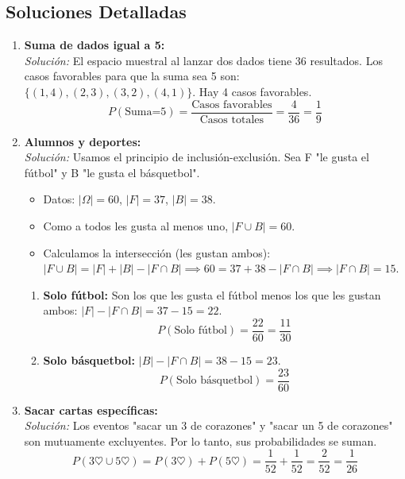 \documentclass[12pt, letterpaper]{article}
\begin{document}
\subsection{Soluciones Detalladas}
\begin{enumerate}
	\item \textbf{Suma de dados igual a 5:} \\
	      \textit{Solución:} El espacio muestral al lanzar dos dados tiene 36 resultados. Los casos favorables para que la suma sea 5 son: $\{(1,4), (2,3), (3,2), (4,1)\}$. Hay 4 casos favorables.
	      \[ P(\text{Suma=5}) = \frac{\text{Casos favorables}}{\text{Casos totales}} = \frac{4}{36} = \frac{1}{9} \]

	\item \textbf{Alumnos y deportes:} \\
	      \textit{Solución:} Usamos el principio de inclusión-exclusión. Sea F "le gusta el fútbol" y B "le gusta el básquetbol".
	      \begin{itemize}
		      \item Datos: $|\Omega|=60$, $|F|=37$, $|B|=38$.
		      \item Como a todos les gusta al menos uno, $|F \cup B| = 60$.
		      \item Calculamos la intersección (les gustan ambos):
		            $|F \cup B| = |F| + |B| - |F \cap B| \implies 60 = 37 + 38 - |F \cap B| \implies |F \cap B| = 15$.
	      \end{itemize}
	      \begin{enumerate}
		      \item \textbf{Solo fútbol:} Son los que les gusta el fútbol menos los que les gustan ambos: $|F| - |F \cap B| = 37 - 15 = 22$.
		            \[ P(\text{Solo fútbol}) = \frac{22}{60} = \frac{11}{30} \]
		      \item \textbf{Solo básquetbol:} $|B| - |F \cap B| = 38 - 15 = 23$.
		            \[ P(\text{Solo básquetbol}) = \frac{23}{60} \]
	      \end{enumerate}

	\item \textbf{Sacar cartas específicas:} \\
	      \textit{Solución:} Los eventos "sacar un 3 de corazones" y "sacar un 5 de corazones" son mutuamente excluyentes. Por lo tanto, sus probabilidades se suman.
	      \[ P(\text{3}\heartsuit \cup \text{5}\heartsuit) = P(3\heartsuit) + P(5\heartsuit) = \frac{1}{52} + \frac{1}{52} = \frac{2}{52} = \frac{1}{26} \]


\end{enumerate}
\end{document}

